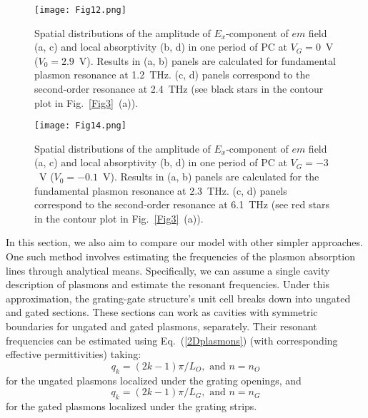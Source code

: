 \documentclass[%
 reprint,
 amsmath,amssymb,
 aps,
]{revtex4-2}
\begin{document}
\begin{figure}[b!]
\texttt{[image: Fig12.png]}
\caption{
Spatial distributions of the amplitude of $E_x$-component of $em$ field (a, c) and local absorptivity (b, d) in one period of PC at $V_G = 0$~V ($V_0 = 2.9$~V). Results in (a, b) panels are calculated for fundamental plasmon resonance at 1.2~THz. (c, d) panels correspond to the second-order resonance at 2.4~THz (see black stars in the contour plot in Fig.~\ref{Fig3}~(a)).
}
\label{Fig12}
\end{figure}

\begin{figure}[b!]
\texttt{[image: Fig14.png]}
\caption{
Spatial distributions of the amplitude of $E_x$-component of $em$ field (a, c) and local absorptivity (b, d) in one period of PC at $V_G = -3$~V ($V_0 = -0.1$~V). Results in (a, b) panels are calculated for the fundamental plasmon resonance at 2.3~THz. (c, d) panels correspond to the second-order resonance at 6.1~THz (see red stars in the contour plot in Fig.~\ref{Fig3}~(a)).
}
\label{Fig14}
\end{figure}

In this section, we also aim to compare our model with other simpler approaches. One such method involves estimating the frequencies of the plasmon absorption lines through analytical means. Specifically, we can assume a single cavity description of plasmons and estimate the resonant frequencies. Under this approximation, the grating-gate structure's unit cell breaks down into ungated and gated sections.
These sections can work as cavities with symmetric boundaries for ungated and gated plasmons, separately. Their resonant frequencies can be estimated using Eq.~(\ref{2Dplasmons}) (with corresponding effective permittivities) taking:
\begin{equation}
\label{ungated_k}
q_k=(2k-1)\pi/L_O,\,\, \text{and}\,\, n=n_{O} 		
\end{equation}
for the ungated plasmons localized under the grating openings, and
\begin{equation}
\label{gated_k}
q_k=(2k-1)\pi/L_G, \,\, \text{and}\,\, n=n_{G} 				
\end{equation}
for the gated plasmons localized under the grating strips.
\end{document}
